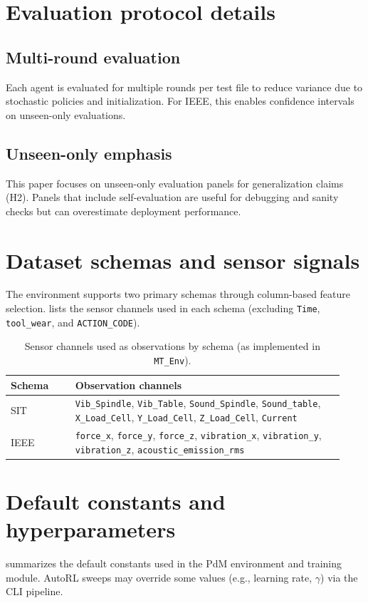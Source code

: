 \documentclass[11pt]{article}
\begin{document}
\section{Evaluation protocol details}
\label{app:eval}
\subsection{Multi-round evaluation}
Each agent is evaluated for multiple rounds per test file to reduce variance due to stochastic policies and initialization. For IEEE, this enables confidence intervals on unseen-only evaluations.

\subsection{Unseen-only emphasis}
This paper focuses on unseen-only evaluation panels for generalization claims (H2). Panels that include self-evaluation are useful for debugging and sanity checks but can overestimate deployment performance.

\section{Dataset schemas and sensor signals}
\label{app:schema}
The environment supports two primary schemas through column-based feature selection.  lists the sensor channels used in each schema (excluding \texttt{Time}, \texttt{tool\_wear}, and \texttt{ACTION\_CODE}).

\begin{table}[t]
\centering
\caption{Sensor channels used as observations by schema (as implemented in \texttt{MT\_Env}).}
\label{tab:schema_features}
\begin{tabular}{p{0.18\linewidth} p{0.75\linewidth}}
\toprule
\rowcolor{gray!20} \textbf{Schema} & \textbf{Observation channels}\\
\midrule
SIT & \texttt{Vib\_Spindle}, \texttt{Vib\_Table}, \texttt{Sound\_Spindle}, \texttt{Sound\_table}, \texttt{X\_Load\_Cell}, \texttt{Y\_Load\_Cell}, \texttt{Z\_Load\_Cell}, \texttt{Current}\\
IEEE & \texttt{force\_x}, \texttt{force\_y}, \texttt{force\_z}, \texttt{vibration\_x}, \texttt{vibration\_y}, \texttt{vibration\_z}, \texttt{acoustic\_emission\_rms}\\
\bottomrule
\end{tabular}
\end{table}

\section{Default constants and hyperparameters}
\label{app:defaults}
 summarizes the default constants used in the PdM environment and training module. AutoRL sweeps may override some values (e.g., learning rate, $\gamma$) via the CLI pipeline.
\end{document}
